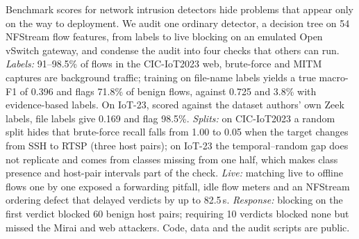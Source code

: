 Benchmark scores for network intrusion detectors hide problems that appear only on the way to deployment. We audit one ordinary detector, a decision tree on 54 NFStream flow features, from labels to live blocking on an emulated Open vSwitch gateway, and condense the audit into four checks that others can run. \emph{Labels:} 91--98.5\% of flows in the CIC-IoT2023 web, brute-force and MITM captures are background traffic; training on file-name labels yields a true macro-F1 of 0.396 and flags 71.8\% of benign flows, against 0.725 and 3.8\% with evidence-based labels. On IoT-23, scored against the dataset authors' own Zeek labels, file labels give 0.169 and flag 98.5\%. \emph{Splits:} on CIC-IoT2023 a random split hides that brute-force recall falls from 1.00 to 0.05 when the target changes from SSH to RTSP (three host pairs); on IoT-23 the temporal--random gap does not replicate and comes from classes missing from one half, which makes class presence and host-pair intervals part of the check. \emph{Live:} matching live to offline flows one by one exposed a forwarding pitfall, idle flow meters and an NFStream ordering defect that delayed verdicts by up to 82.5\,s. \emph{Response:} blocking on the first verdict blocked 60 benign host pairs; requiring 10 verdicts blocked none but missed the Mirai and web attackers. Code, data and the audit scripts are public.

